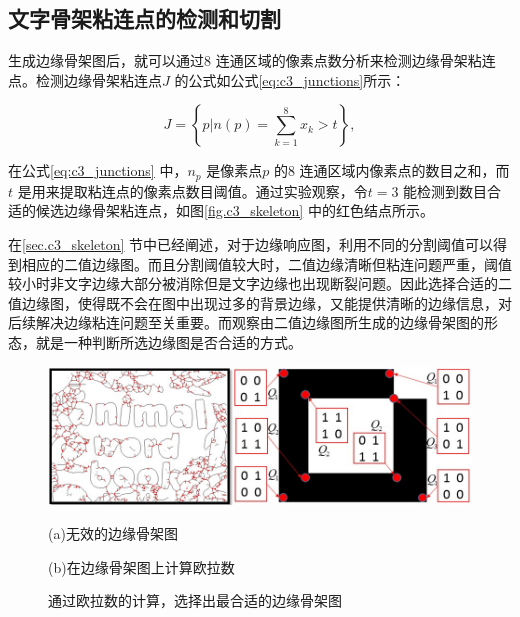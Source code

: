        \subsection{文字骨架粘连点的检测和切割}
        \label{sec.c3_skeleton_cut}

        生成边缘骨架图后，就可以通过8 连通区域的像素点数分析来检测边缘骨架粘连点。检测边缘骨架粘连点$J$ 的公式如公式\ref{eq:c3_junctions}所示：

        \begin{equation}
        J=\left\{ p|n(p)=\sum_{k=1}^8x_k>t \right\},
        \label{eq:c3_junctions}
        \end{equation}

        在公式\ref{eq:c3_junctions} 中，$n_p$ 是像素点$p$ 的8 连通区域内像素点的数目之和，而$t$ 是用来提取粘连点的像素点数目阈值。通过实验观察，令$t = 3$ 能检测到数目合适的候选边缘骨架粘连点，如图\ref{fig.c3_skeleton} 中的红色结点所示。

        在\ref{sec.c3_skeleton} 节中已经阐述，对于边缘响应图，利用不同的分割阈值可以得到相应的二值边缘图。而且分割阈值较大时，二值边缘清晰但粘连问题严重，阈值较小时非文字边缘大部分被消除但是文字边缘也出现断裂问题。因此选择合适的二值边缘图，使得既不会在图中出现过多的背景边缘，又能提供清晰的边缘信息，对后续解决边缘粘连问题至关重要。而观察由二值边缘图所生成的边缘骨架图的形态，就是一种判断所选边缘图是否合适的方式。

        \begin{figure}[!h]
        \centering
        \includegraphics[width=\textwidth]{./figures/c3_select_skeleton.jpg}
        \begin{minipage}[t]{0.48\linewidth}
        \centerline{\small (a)无效的边缘骨架图}
        \end{minipage}
        \begin{minipage}[t]{0.48\linewidth}
        \centerline{\small (b)在边缘骨架图上计算欧拉数}
        \end{minipage}
        \caption{通过欧拉数的计算，选择出最合适的边缘骨架图}
        \label{fig.c3_select_skeleton}
        \end{figure}

